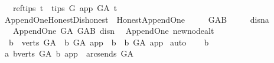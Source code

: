 \begin{isabellebody}
\ \ \ ref{\isacharunderscore}{\kern0pt}tips{\isacharcolon}{\kern0pt}\ {\isachardoublequoteopen}{\isasymforall}t\ {\isasymin}\ tips\ G{\isachardot}{\kern0pt}\ app\ {\isasymrightarrow}\isactrlbsub G{\isacharunderscore}{\kern0pt}A\isactrlesub \ t{\isachardoublequoteclose}\ \ \isanewline
\isanewline
\isanewline
{}\isamarkupfalse%
\ Append{\isacharunderscore}{\kern0pt}One{\isacharunderscore}{\kern0pt}Honest{\isacharunderscore}{\kern0pt}Dishonest\ {\isacharequal}{\kern0pt}\ Honest{\isacharunderscore}{\kern0pt}Append{\isacharunderscore}{\kern0pt}One\ {\isacharplus}{\kern0pt}\ \isanewline
\ \ \ G{\isacharunderscore}{\kern0pt}AB\ \ {\isacharparenleft}{\kern0pt}\isanewline
\ \ \ dis{\isacharunderscore}{\kern0pt}n{\isacharcolon}{\kern0pt}{\isacharcolon}{\kern0pt}{\isacharprime}{\kern0pt}a\isanewline
\ \ \ {\isachardoublequoteopen}Append{\isacharunderscore}{\kern0pt}One\ G{\isacharunderscore}{\kern0pt}A\ G{\isacharunderscore}{\kern0pt}AB\ dis{\isacharunderscore}{\kern0pt}n{\isachardoublequoteclose}%
\isadelimdocument
%
\endisadelimdocument
%
\isatagdocument
%
\isamarkuptrue%
%
\endisatagdocument
{\isafolddocument}%
%
\isadelimdocument
%
\endisadelimdocument
{}\isamarkupfalse%
\ {\isacharparenleft}{\kern0pt}\ Append{\isacharunderscore}{\kern0pt}One{\isacharparenright}{\kern0pt}\ new{\isacharunderscore}{\kern0pt}node{\isacharunderscore}{\kern0pt}alt{\isacharcolon}{\kern0pt}\isanewline
\ \ {\isachardoublequoteopen}{\isacharparenleft}{\kern0pt}{\isasymforall}b\ {\isasymin}\ verts\ G{\isacharunderscore}{\kern0pt}A{\isachardot}{\kern0pt}\ {\isasymnot}\ b\ {\isasymrightarrow}\isactrlbsub G{\isacharunderscore}{\kern0pt}A\isactrlesub \ app{\isacharparenright}{\kern0pt}\ {\isasymlongleftrightarrow}\ {\isacharparenleft}{\kern0pt}{\isasymforall}b{\isachardot}{\kern0pt}\ {\isasymnot}\ b\ {\isasymrightarrow}\isactrlbsub G{\isacharunderscore}{\kern0pt}A\isactrlesub \ app{\isacharparenright}{\kern0pt}{\isachardoublequoteclose}\ \isanewline
%
\isadelimproof
%
\endisadelimproof
%
\isatagproof
{}\isamarkupfalse%
{\isacharparenleft}{\kern0pt}auto{\isacharparenright}{\kern0pt}\isanewline
\ \ \isamarkupfalse%
\ b\isanewline
\ \ \isamarkupfalse%
\ a{}{\isacharcolon}{\kern0pt}\ {\isachardoublequoteopen}{\isasymforall}b{\isasymin}verts\ G{\isacharunderscore}{\kern0pt}A{\isachardot}{\kern0pt}\ {\isacharparenleft}{\kern0pt}b{\isacharcomma}{\kern0pt}\ app{\isacharparenright}{\kern0pt}\ {\isasymnotin}\ arcs{\isacharunderscore}{\kern0pt}ends\ G{\isacharunderscore}{\kern0pt}A{\isachardoublequoteclose}\isanewline

\end{isabellebody}
